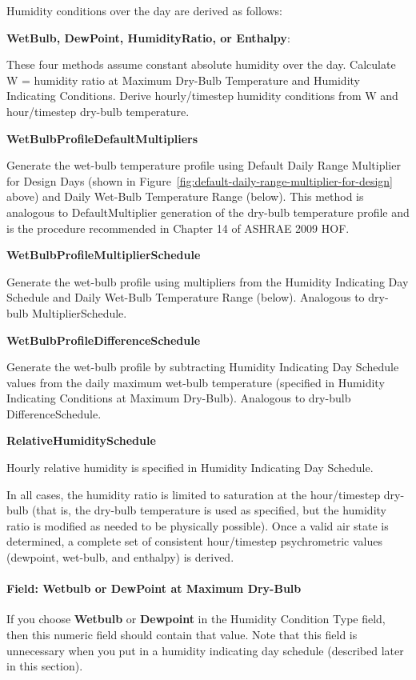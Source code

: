 Humidity conditions over the day are derived as follows:

\textbf{WetBulb, DewPoint, HumidityRatio, or Enthalpy}:

These four methods assume constant absolute humidity over the day. Calculate W = humidity ratio at Maximum Dry-Bulb Temperature and Humidity Indicating Conditions. Derive hourly/timestep humidity conditions from W and hour/timestep dry-bulb temperature.

\textbf{WetBulbProfileDefaultMultipliers}

Generate the wet-bulb temperature profile using Default Daily Range Multiplier for Design Days (shown in Figure~\ref{fig:default-daily-range-multiplier-for-design} above) and Daily Wet-Bulb Temperature Range (below). This method is analogous to DefaultMultiplier generation of the dry-bulb temperature profile and is the procedure recommended in Chapter 14 of ASHRAE 2009 HOF.

\textbf{WetBulbProfileMultiplierSchedule}

Generate the wet-bulb profile using multipliers from the Humidity Indicating Day Schedule and Daily Wet-Bulb Temperature Range (below). Analogous to dry-bulb MultiplierSchedule.

\textbf{WetBulbProfileDifferenceSchedule}

Generate the wet-bulb profile by subtracting Humidity Indicating Day Schedule values from the daily maximum wet-bulb temperature (specified in Humidity Indicating Conditions at Maximum Dry-Bulb). Analogous to dry-bulb DifferenceSchedule.

\textbf{RelativeHumiditySchedule}

Hourly relative humidity is specified in Humidity Indicating Day Schedule.

In all cases, the humidity ratio is limited to saturation at the hour/timestep dry-bulb (that is, the dry-bulb temperature is used as specified, but the humidity ratio is modified as needed to be physically possible). Once a valid air state is determined, a complete set of consistent hour/timestep psychrometric values (dewpoint, wet-bulb, and enthalpy) is derived.

\paragraph{Field: Wetbulb or DewPoint at Maximum Dry-Bulb}\label{field-wetbulb-or-dewpoint-at-maximum-dry-bulb}

If you choose \textbf{Wetbulb} or \textbf{Dewpoint} in the Humidity Condition Type field, then this numeric field should contain that value. Note that this field is unnecessary when you put in a humidity indicating day schedule (described later in this section).

